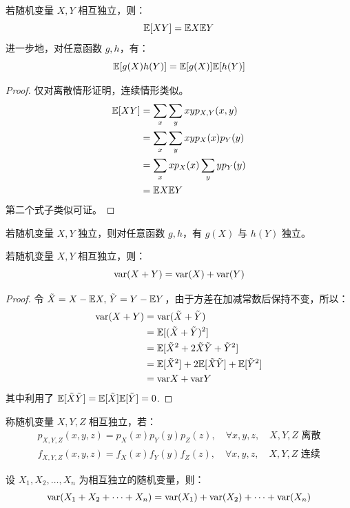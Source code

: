 \begin{theorem}
若随机变量 $X,Y$ 相互独立，则：
\[
\mathbb{E}[XY]=\mathbb{E} X\mathbb{E} Y
\]
进一步地，对任意函数 $g,h$，有：
\[
\mathbb{E}[g(X)h(Y)]=\mathbb{E}[g(X)]\mathbb{E}[h(Y)]
\]
\end{theorem}
\begin{proof}
仅对离散情形证明，连续情形类似。
\begin{align*}
\mathbb{E}[XY]&=\sum_x\sum_y xyp_{X,Y}(x,y)\\
&=\sum_x\sum_y xyp_X(x)p_Y(y)\\
&=\sum_x xp_X(x)\sum_y yp_Y(y)\\
&=\mathbb{E} X\mathbb{E} Y
\end{align*}
第二个式子类似可证。
\end{proof}

\begin{corollary}
若随机变量 $X,Y$ 独立，则对任意函数 $g,h$，有 $g(X)$ 与 $h(Y)$ 独立。
\end{corollary}

\begin{theorem}
若随机变量 $X,Y$ 相互独立，则：
\[
\mathrm{var}(X+Y)=\mathrm{var}(X)+\mathrm{var}(Y)
\]
\end{theorem}
\begin{proof}
令 $\tilde X=X-\mathbb{E} X,\,\tilde Y=Y-\mathbb{E} Y$，由于方差在加减常数后保持不变，所以：
\begin{align*}
\mathrm{var}(X+Y)&=\mathrm{var}(\tilde X+\tilde Y)\\
&=\mathbb{E}[(\tilde X+\tilde Y)^2]\\
&=\mathbb{E}[{\tilde X}^2+2\tilde X\tilde Y+{\tilde Y}^2]\\
&=\mathbb{E}[{\tilde X}^2]+2\mathbb{E}[\tilde X\tilde Y]+\mathbb{E}[{\tilde Y}^2]\\
&=\mathrm{var} X+\mathrm{var} Y
\end{align*}
其中利用了 $\mathbb{E}[\tilde X\tilde Y]=\mathbb{E}[\tilde X]\mathbb{E}[\tilde Y]=0$.
\end{proof}

\begin{definition}[多个随机变量独立性]
称随机变量 $X,Y,Z$ 相互独立，若：
\begin{gather*}
p_{X,Y,Z}(x,y,z)=p_X(x)p_Y(y)p_Z(z),\quad\forall x,y,z,\quad\text{$X,Y,Z$ 离散}\\
f_{X,Y,Z}(x,y,z)=f_X(x)f_Y(y)f_Z(z),\quad\forall x,y,z,\quad\text{$X,Y,Z$ 连续}
\end{gather*}
\end{definition}

\begin{theorem}[多个独立随机变量和的方差]
设 $X_1,X_2,\ldots,X_n$ 为相互独立的随机变量，则：
\[
\mathrm{var}(X_1+X_2+\cdots+X_n)=\mathrm{var}(X_1)+\mathrm{var}(X_2)+\cdots+\mathrm{var}(X_n)
\]
\end{theorem}




